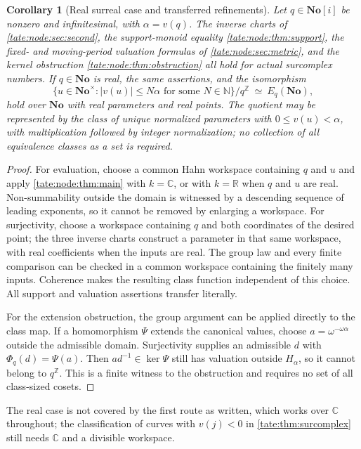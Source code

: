 \documentclass[11pt,letterpaper]{article}
\newtheorem{corollary}[corollary]{Corollary}
\theoremstyle{definition}
\newcommand{\C}{\mathbb C}
\newcommand{\R}{\mathbb R}
\newcommand{\Z}{\mathbb Z}
\newcommand{\N}{\mathbb N}
\newcommand{\No}{\mathbf{No}}
\begin{document}
\begin{corollary}[Real surreal case and transferred refinements]\label{tate:node:cor:real}
Let $q\in\No[i]$ be nonzero and infinitesimal, with $\alpha=v(q)$. The
inverse charts of \cref{tate:node:sec:second}, the support-monoid equality
\cref{tate:node:thm:support}, the fixed- and moving-period valuation
formulas of \cref{tate:node:sec:metric}, and the kernel obstruction
\cref{tate:node:thm:obstruction} all hold for actual surcomplex numbers.
If $q\in\No$ is real, the same assertions, and the isomorphism
\[
 \{u\in\No^\times:|v(u)|\le N\alpha\text{ for some }N\in\N\}/q^\Z
 \ \simeq\ E_q(\No),
\]
hold over $\No$ with real parameters and real points. The quotient may be
represented by the class of unique normalized parameters with
$0\le v(u)<\alpha$, with multiplication followed by integer normalization;
no collection of all equivalence classes as a set is required.
\end{corollary}

\begin{proof}
For evaluation, choose a common Hahn workspace containing $q$ and $u$ and
apply \cref{tate:node:thm:main} with $k=\C$, or with $k=\R$ when $q$ and
$u$ are real. Non-summability outside the domain is witnessed by a
descending sequence of leading exponents, so it cannot be removed by
enlarging a workspace. For surjectivity, choose a workspace containing $q$
and both coordinates of the desired point; the three inverse charts
construct a parameter in that same workspace, with real coefficients when
the inputs are real. The group law and every finite comparison can be
checked in a common workspace containing the finitely many inputs.
Coherence makes the resulting class function independent of this choice.
All support and valuation assertions transfer literally.

For the extension obstruction, the group argument can be applied directly
to the class map. If a homomorphism $\Psi$ extends the canonical values,
choose $a=\omega^{-\omega\alpha}$ outside the admissible domain.
Surjectivity supplies an admissible $d$ with $\Phi_q(d)=\Psi(a)$.
Then $ad^{-1}\in\ker\Psi$ still has valuation outside $H_\alpha$, so it
cannot belong to $q^\Z$. This is a finite witness to the obstruction and
requires no set of all class-sized cosets.
\end{proof}

The real case is not covered by the first route as written, which works
over $\C$ throughout; the classification of curves with $v(j)<0$ in
\cref{tate:thm:surcomplex} still needs $\C$ and a divisible workspace.
\end{document}
